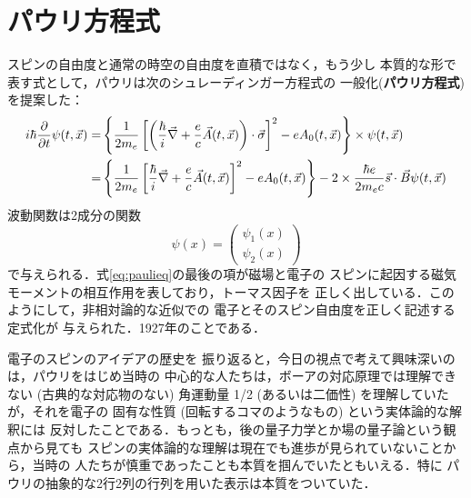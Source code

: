 \documentclass{jsarticle}
\begin{document}
\section{パウリ方程式}
\label{sec:paulieq}

スピンの自由度と通常の時空の自由度を直積ではなく，もう少し
本質的な形で表す式として，パウリは次のシュレーディンガー方程式の
一般化(\textbf{パウリ方程式})を提案した：
\begin{align}
    i\hbar\frac{\partial}{\partial t}\psi(t,\vec{x}) 
    = &
    \left\{
        \frac{1}{2m_e} \left[ \left(\frac{\hbar}{i}\vec{\nabla} + \frac{e}{c}\vec{A}(t,\vec{x})\right)\cdot\vec{\sigma} \right]^2 - e A_0(t,\vec{x})
    \right\}\times\psi(t,\vec{x})  
    \notag\\ %
    = & \label{eq:paulieq} %
    \left\{
        \frac{1}{2m_e} \left[ \frac{\hbar}{i}\vec{\nabla} + \frac{e}{c}\vec{A}(t,\vec{x}) \right]^2 - e A_0(t,\vec{x})
    \right\} -2\times \frac{\hbar e}{2m_e c}  \vec{s}\cdot\vec{B}\psi(t,\vec{x}) 
\end{align}
波動関数は2成分の関数
\[
\psi(x) = \begin{pmatrix}
    \psi_1(x) \\
    \psi_2(x)  
\end{pmatrix}
\]
で与えられる．式\eqref{eq:paulieq}の最後の項が磁場と電子の
スピンに起因する磁気モーメントの相互作用を表しており，トーマス因子を
正しく出している．このようにして，非相対論的な近似での
電子とそのスピン自由度を正しく記述する定式化が
与えられた．1927年のことである．

電子のスピンのアイデアの歴史を
振り返ると，今日の視点で考えて興味深いのは，パウリをはじめ当時の
中心的な人たちは，ボーアの対応原理では理解できない (古典的な対応物のない) 
角運動量 1/2 (あるいは二価性) を理解していたが，それを電子の
固有な性質 (回転するコマのようなもの) という実体論的な解釈には
反対したことである．もっとも，後の量子力学とか場の量子論という観点から見ても
スピンの実体論的な理解は現在でも進歩が見られていないことから，当時の
人たちが慎重であったことも本質を掴んでいたともいえる．特に
パウリの抽象的な2行2列の行列を用いた表示は本質をついていた．
\end{document}
